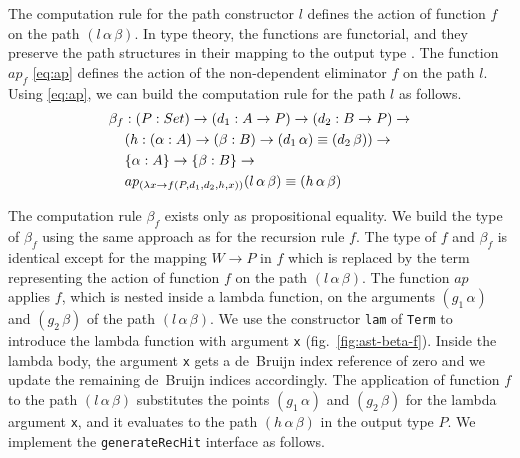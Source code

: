 \documentclass[sigplan,10pt]{acmart}
\begin{document}
The computation rule for the path constructor $l$ defines the action of function $f$ on the path $(l \, \alpha \, \beta)$. In type theory, the functions are functorial, and they preserve the path structures in their mapping to the output type \citep{HoTT-2013}. The function $ap_f$ \eqref{eq:ap} defines the action of the non-dependent eliminator $f$ on the path $l$. Using \eqref{eq:ap}, we can build the computation rule for the path $l$ as follows.
\begin{align}
& \beta_f : (P : Set) \rightarrow (d_1 : A \rightarrow P) \rightarrow (d_2 : B \rightarrow P) \rightarrow \nonumber \\
& \hspace {0.4cm} (h : (\alpha : A) \rightarrow (\beta : B) \rightarrow (d_1 \,  \alpha) \equiv (d_2 \, \beta)) \rightarrow \nonumber \\
& \hspace {0.4cm} \{\alpha : A\} \rightarrow \{\beta : B\} \rightarrow \nonumber \\
& \hspace {0.4cm} ap_{(\lambda x \rightarrow f(P, d_1, d_2, h, x))}(l \, \alpha \, \beta) \equiv (h \, \alpha \, \beta) \nonumber
\end{align}

The computation rule $\beta_f$ exists only as propositional equality. We build the type of $\beta_f$ using the same approach as for the recursion rule $f$. The type of $f$ and $\beta_f$ is identical except for the mapping $W \rightarrow P$ in $f$ which is replaced by the term representing the action of function $f$ on the path $(l \, \alpha \, \beta)$. The function $ap$ applies $f$, which is nested inside a lambda function, on the arguments $(g_1 \, \alpha)$ and $(g_2 \, \beta)$ of the path $(l \, \alpha \, \beta)$. We use the constructor {\tt lam} of {\tt Term} to introduce the lambda function with argument {\tt x} (fig.~\ref{fig:ast-beta-f}). Inside the lambda body, the argument {\tt x} gets a de~Bruijn index reference of zero and we update the remaining de~Bruijn indices accordingly. The application of function $f$ to the path $(l \, \alpha \, \beta)$ substitutes the points $(g_1 \, \alpha)$ and $(g_2 \, \beta)$ for the lambda argument {\tt x}, and it evaluates to the path $(h \, \alpha \, \beta)$ in the output type $P$. We implement the {\tt generateRecHit} interface as follows. 
\end{document}
